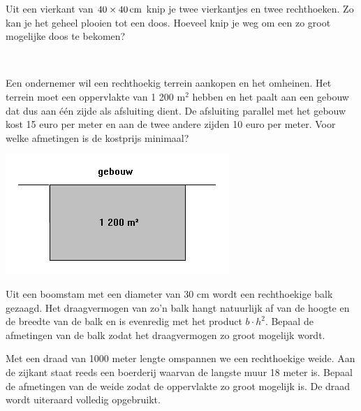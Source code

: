 \documentclass[a4paper,12pt,twoside]{article}
\begin{document}
\begin{oefening}
  Uit een vierkant van $40 \times 40 \cm$ knip je twee vierkantjes en twee rechthoeken. Zo kan je het geheel plooien tot een doos. Hoeveel knip je weg om een zo groot mogelijke doos te bekomen?
\end{oefening}

\begin{oefening}\\
  \begin{minipage}{0.6\textwidth}
    Een ondernemer wil een rechthoekig terrein aankopen en het omheinen. Het terrein moet een oppervlakte van 1 200 m$^2$ hebben en het paalt aan een gebouw dat dus aan één zijde als afsluiting dient. De afsluiting parallel met het gebouw kost 15 euro per meter en aan de twee andere zijden 10 euro per meter. Voor welke afmetingen is de kostprijs minimaal?
  \end{minipage}
  \begin{minipage}{0.4\textwidth}
    \centering
    \includegraphics[width=\textwidth]{terrein-omheinen}
  \end{minipage}
\end{oefening}

\begin{oefening}
  Uit een boomstam met een diameter van 30 cm wordt een rechthoekige balk gezaagd. Het draagvermogen van zo'n balk hangt natuurlijk af van de hoogte en de breedte van de balk en is evenredig met het product $b\cdot h^2$. Bepaal de afmetingen van de balk zodat het draagvermogen zo groot mogelijk wordt.
\end{oefening}

\begin{oefening}
  Met een draad van 1000 meter lengte omspannen we een rechthoekige weide. Aan de zijkant staat reeds een boerderij waarvan de langste muur 18 meter is. Bepaal de afmetingen van de weide zodat de oppervlakte zo groot mogelijk is. De draad wordt uiteraard volledig opgebruikt.
\end{oefening}
\end{document}
